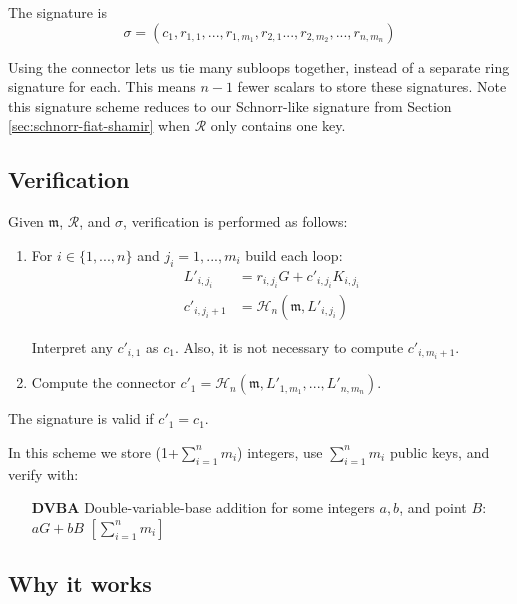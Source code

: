 The signature is
 \[\sigma = (c_1, r_{1, 1}, ..., r_{1, m_1}, r_{2,1} ..., r_{2,m_2}, ..., r_{n, m_n} )  \]

Using the connector lets us tie many subloops together, instead of a separate ring signature for each. This means $n-1$ fewer scalars to store these signatures. Note this signature scheme reduces to our Schnorr-like signature from Section \ref{sec:schnorr-fiat-shamir} when $\mathcal{R}$ only contains one key.

\subsection*{Verification}

Given \(\mathfrak{m}\), $\mathcal{R}$, and $\sigma$, verification is performed as follows:

\begin{enumerate}
	
	\item For \(i \in \{1, ..., n\} \) and \(j_i = 1, ..., m_i \) build each loop:\vspace{.2cm}
	\begin{align*}
	   L'_{i, j_i} &= r_{i, j_i} G + c'_{i, j_i} K_{i, j_i} \\
	   c'_{i, j_i+1} &= \mathcal{H}_n (\mathfrak{m}, L'_{i, j_i}) 
	\end{align*}
	
	Interpret any \(c'_{i, 1}\) as \(c_1\). Also, it is not necessary to compute $c'_{i, m_i+1}$.
	
	\item Compute the connector \(c'_1 = \mathcal{H}_n (\mathfrak{m}, L'_{1, m_1}, ..., L'_{n, m_n}) \).
	
\end{enumerate}

The signature is valid if \(c'_1 = c_1\).

In this scheme we store (1+$\sum^n_{i=1} m_i$) integers, use $\sum^n_{i=1} m_i$ public keys, and verify with:

\begin{itemize}
    \setlength\itemsep{\listspace}
    \item [\textbf{DVBA}] Double-variable-base addition for some integers $a, b$, and point $B$: $a G + b B$ \quad \([\sum^n_{i=1} m_i]\)
\end{itemize}


\subsection*{Why it works}


